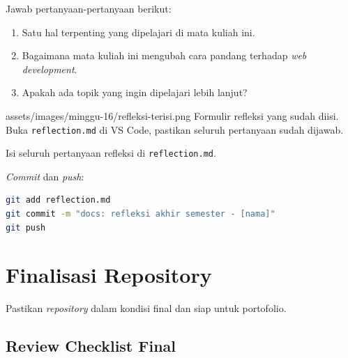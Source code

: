 Jawab pertanyaan-pertanyaan berikut:
\begin{enumerate}
  \item Satu hal terpenting yang dipelajari di mata kuliah ini.
  \item Bagaimana mata kuliah ini mengubah cara pandang terhadap \emph{web development}.
  \item Apakah ada topik yang ingin dipelajari lebih lanjut?
\end{enumerate}

\begin{tangkapanlayar}
  {assets/images/minggu-16/refleksi-terisi.png}
  {Formulir refleksi yang sudah diisi.}
  {Buka \texttt{reflection.md} di VS Code, pastikan seluruh pertanyaan sudah dijawab.}
\end{tangkapanlayar}

\begin{langkah}
  \item Isi seluruh pertanyaan refleksi di \texttt{reflection.md}.
  \item \emph{Commit} dan \emph{push}:
\begin{lstlisting}[language=bash, caption={Commit refleksi}]
git add reflection.md
git commit -m "docs: refleksi akhir semester - [nama]"
git push
\end{lstlisting}
\end{langkah}

\section{Finalisasi Repository}
\label{sec:finalisasi-repo}

Pastikan \emph{repository} dalam kondisi final dan siap untuk portofolio.

\subsection{Review Checklist Final}
\label{subsec:checklist-final}

